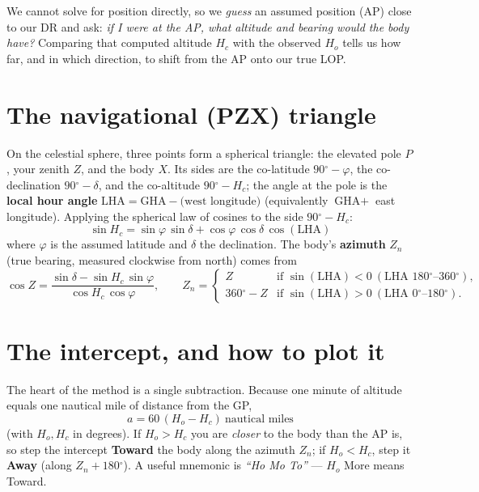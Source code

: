 \documentclass[10pt,letterpaper,twoside]{book}
\newcommand{\dg}{\ensuremath{{}^{\circ}}}
\begin{document}
We cannot solve for position directly, so we \emph{guess} an assumed position (AP)
close to our DR and ask: \emph{if I were at the AP, what altitude and bearing
would the body have?} Comparing that computed altitude $H_c$ with the observed
$H_o$ tells us how far, and in which direction, to shift from the AP onto our true
LOP.

\section{The navigational (PZX) triangle}
On the celestial sphere, three points form a spherical triangle: the elevated
pole $P$, your zenith $Z$, and the body $X$. Its sides are the co-latitude
$90\dg-\varphi$, the co-declination $90\dg-\delta$, and the co-altitude
$90\dg-H_c$; the angle at the pole is the \textbf{local hour angle}
$\text{LHA}=\text{GHA}-\text{(west longitude)}$ (equivalently $\text{GHA}+$ east
longitude). Applying the spherical law of cosines to the side $90\dg-H_c$:
\begin{equation}
  \boxed{\;\sin H_c = \sin\varphi\,\sin\delta + \cos\varphi\,\cos\delta\,\cos(\text{LHA})\;}
\end{equation}
where $\varphi$ is the assumed latitude and $\delta$ the declination. The body's
\textbf{azimuth} $Z_n$ (true bearing, measured clockwise from north) comes from
\begin{equation}
  \cos Z = \frac{\sin\delta - \sin H_c\,\sin\varphi}{\cos H_c\,\cos\varphi},
  \qquad
  Z_n = \begin{cases} Z & \text{if } \sin(\text{LHA})<0 \ (\text{LHA }180\dg\text{--}360\dg),\\
                      360\dg - Z & \text{if } \sin(\text{LHA})>0 \ (\text{LHA }0\dg\text{--}180\dg).\end{cases}
\end{equation}

\section{The intercept, and how to plot it}
The heart of the method is a single subtraction. Because one minute of altitude
equals one nautical mile of distance from the GP,
\begin{equation}
  \boxed{\; a = 60\,(H_o - H_c)\ \text{nautical miles}\;}
\end{equation}
(with $H_o,H_c$ in degrees). If $H_o>H_c$ you are \emph{closer} to the body than
the AP is, so step the intercept \textbf{Toward} the body along the azimuth $Z_n$;
if $H_o<H_c$, step it \textbf{Away} (along $Z_n+180\dg$). A useful mnemonic is
\emph{``Ho Mo To''} --- $H_o$ More means Toward.
\end{document}
